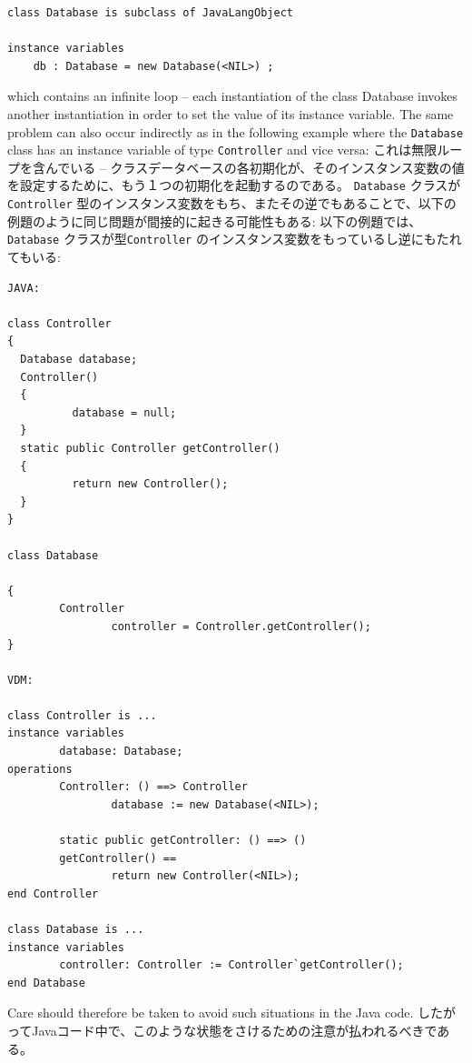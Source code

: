\documentclass[\pformat,12pt]{jarticle}
\begin{document}
\begin{small}
\begin{verbatim}
class Database is subclass of JavaLangObject

instance variables
    db : Database = new Database(<NIL>) ;
\end{verbatim}
\end{small}

which contains an infinite loop -- each instantiation of the class
Database invokes another instantiation in order to set the value of
its instance variable. The same problem can also occur indirectly as
in the following example where the \texttt{Database} class has an
instance variable of type \texttt{Controller} and vice versa:
これは無限ループを含んでいる -- クラスデータベースの各初期化が、そのインスタンス変数の値を設定するために、もう１つの初期化を起動するのである。
 \texttt{Database} クラスが \texttt{Controller} 型のインスタンス変数をもち、またその逆でもあることで、以下の例題のように同じ問題が間接的に起きる可能性もある:
以下の例題では、\texttt{Database} クラスが型\texttt{Controller} のインスタンス変数をもっているし逆にもたれてもいる:

\begin{small}
\begin{verbatim}
JAVA:

class Controller
{
  Database database;
  Controller()
  {
          database = null;
  }
  static public Controller getController()
  {
          return new Controller();
  }
}

class Database

{
        Controller
                controller = Controller.getController();
}

VDM:

class Controller is ...
instance variables
        database: Database;
operations
        Controller: () ==> Controller
                database := new Database(<NIL>);

        static public getController: () ==> ()
        getController() ==
                return new Controller(<NIL>);
end Controller

class Database is ...
instance variables
        controller: Controller := Controller`getController();
end Database
\end{verbatim}
\end{small}

Care should therefore be taken to avoid such situations in the Java
code. 
したがってJavaコード中で、このような状態をさけるための注意が払われるべきである。
\end{document}
